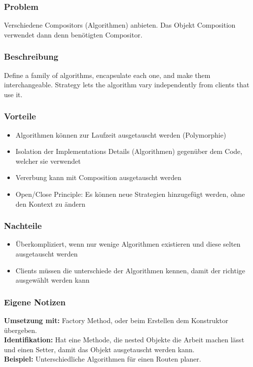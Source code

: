 \subsubsection{Problem}
Verschiedene Compositors (Algorithmen) anbieten. Das Objekt Composition verwendet dann denn benötigten Compositor.
\subsubsection{Beschreibung}
Define a family of algorithms, encapsulate each one, and make them interchangeable. Strategy lets the algorithm vary independently from clients that use it.
\subsubsection{Vorteile}
\begin{itemize}[topsep=0pt]
    \itemsep -0.4em
    \item Algorithmen können zur Laufzeit ausgetauscht werden (Polymorphie)
    \item Isolation der Implementations Details (Algorithmen) gegenüber dem Code, welcher sie verwendet
    \item Vererbung kann mit Composition ausgetauscht werden
    \item Open/Close Principle: Es können neue Strategien hinzugefügt werden, ohne den Kontext zu ändern
\end{itemize}
\subsubsection{Nachteile}
\begin{itemize}[topsep=0pt]
    \itemsep -0.4em
    \item Überkompliziert, wenn nur wenige Algorithmen existieren und diese selten ausgetauscht werden
    \item Clients müssen die unterschiede der Algorithmen kennen, damit der richtige ausgewählt werden kann
\end{itemize}
\subsubsection{Eigene Notizen}
\textbf{Umsetzung mit:} Factory Method, oder beim Erstellen dem Konstruktor übergeben.\\
\textbf{Identifikation:} Hat eine Methode, die nested Objekte die Arbeit machen lässt und einen Setter, damit das Objekt ausgetauscht werden kann.\\
\textbf{Beispiel:} Unterschiedliche Algorithmen für einen Routen planer.

